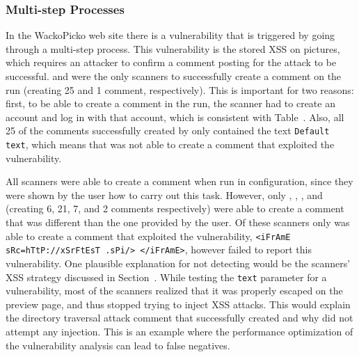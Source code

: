 
\subsubsection{Multi-step Processes}

In the WackoPicko web site there is a vulnerability that is triggered
by going through a multi-step process. This vulnerability is
the stored XSS on pictures, which requires an attacker to 
confirm a comment posting for the attack to be successful. 
\hailstorm{} and \ntospider{} were the only scanners to successfully create a comment on the
\initial{} run (creating 25 and 1 comment, respectively). This is
important for two reasons: first, to be able to create a comment 
in the \initial{} run, the scanner had to  create an account
and log in with that account,
which is consistent with Table~. Also,
all 25 of the comments successfully created by \hailstorm{} only
contained the text {\tt Default text}, which means that \hailstorm{} was not
able to create a comment that exploited the vulnerability. 

All scanners were able to
create a comment when run in \manual{} configuration, since they were shown by 
the user how to carry out this task. However, only \appscan, \hailstorm, \ntospider{},
and \webinspect{} (creating 6, 21, 7, and 2 comments respectively)
were able to create a comment that was different 
than the one provided by the user. Of these scanners only
\webinspect{} was able to create a comment that exploited the
vulnerability, 
{\tt <iFrAmE sRc=hTtP://xSrFtEsT .sPi/> </iFrAmE>}, however \webinspect{} failed
to report this vulnerability. One plausible explanation for not detecting
would be the scanners' XSS strategy discussed in
Section~. While testing the {\tt text} parameter for
a vulnerability, most of the scanners realized that it was properly
escaped on the preview page, and thus stopped trying to inject XSS attacks.
This would explain the directory traversal attack comment that \appscan{}
successfully created and why \hailstorm{} did not attempt any injection. This is
an example where the performance optimization of the vulnerability analysis can
lead to false negatives.

